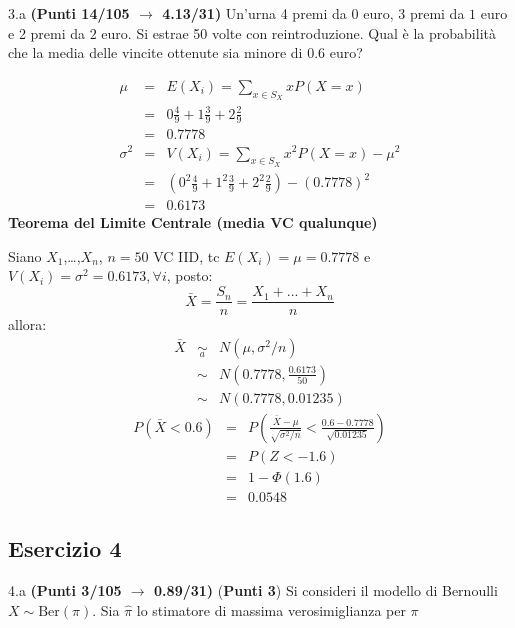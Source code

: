 \documentclass[
  11pt,
]{book}
\theoremstyle{mytheoremstyle}
\theoremstyle{mydefstyle}
\newenvironment{sol}
  {
  \begin{tcolorbox}[enhanced,breakable,arc=0.1mm,boxrule=1pt,colback=white,colframe=iblue,
  title=\bf \fontfamily{lmss}\selectfont \hspace{.5 cm} Soluzione,drop fuzzy shadow]

}{
\end{tcolorbox}
  }
\begin{document}
3.a \textbf{(Punti 14/105 \(\rightarrow\) 4.13/31)} Un'urna 4 premi da \(\mbox{0}\) euro, 3 premi da \(\mbox{1}\) euro e 2 premi da \(\mbox{2}\) euro.
Si estrae 50 volte con reintroduzione.
Qual è la probabilità che la media delle vincite ottenute sia minore di 0.6 euro?

\begin{sol}
\begin{eqnarray*} \mu &=& E(X_i) = \sum_{x\in S_X}x P(X=x)\\ 
 &=&  0  \frac { 4 }{ 9 }+ 1  \frac { 3 }{ 9 }+ 2  \frac { 2 }{ 9 } \\ 
            &=& 0.7778 \\ 
 \sigma^2 &=& V(X_i) = \sum_{x\in S_X}x^2 P(X=x)-\mu^2\\ 
 &=&\left(  0  ^2\frac { 4 }{ 9 }+ 1  ^2\frac { 3 }{ 9 }+ 2  ^2\frac { 2 }{ 9 } \right)-( 0.7778 )^2\\ 
            &=& 0.6173 
\end{eqnarray*}
\textbf{Teorema del Limite Centrale (media VC qualunque)}

Siano \(X_1\),\ldots,\(X_n\), \(n=50\) VC IID, tc \(E(X_i)=\mu=0.7778\) e \(V(X_i)=\sigma^2=0.6173,\forall i\), posto:
\[
      \bar X=\frac{S_n}n =\frac{X_1 + ... + X_n}n
      \]
allora:\begin{eqnarray*}
  \bar X & \mathop{\sim}\limits_{a}& N(\mu,\sigma^2/n) \\
     &\sim & N\left(0.7778,\frac{0.6173}{50}\right) \\
     &\sim & N(0.7778,0.01235)
  \end{eqnarray*}\begin{eqnarray*}
      P( \bar X   <   0.6 ) 
        &=& P\left(  \frac { \bar X  -  \mu }{ \sqrt{\sigma^2/n} }  <  \frac { 0.6  -  0.7778 }{\sqrt{ 0.01235 }} \right)  \\
                 &=& P\left(  Z   <   -1.6 \right) \\    
                 &=&  1-\Phi( 1.6 ) \\ &=&  0.0548 
      \end{eqnarray*}

\end{sol}

\subsection{Esercizio 4}\label{esercizio-4-35}

4.a \textbf{(Punti 3/105 \(\rightarrow\) 0.89/31)} (\textbf{Punti 3}) Si consideri il modello di Bernoulli \(X\sim\text{Ber}(\pi)\). Sia \(\hat\pi\) lo stimatore di massima verosimiglianza per \(\pi\)
\end{document}

